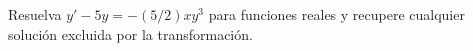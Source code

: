 Resuelva $y'-5y=-(5/2)xy^3$ para funciones reales y recupere cualquier solución excluida por la transformación.
